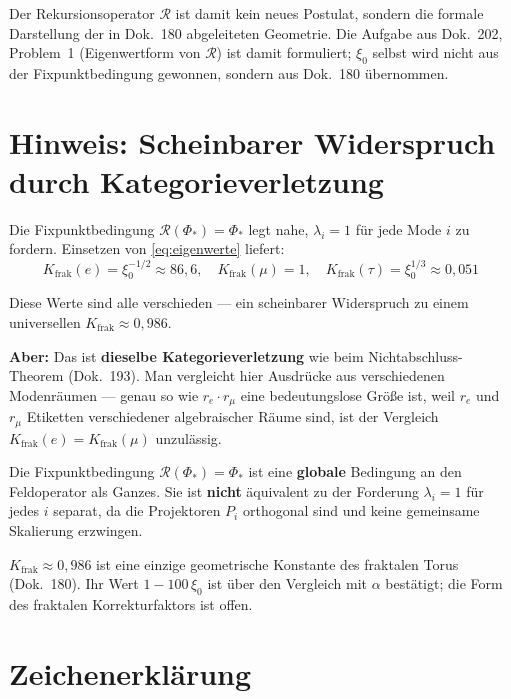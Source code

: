 Der Rekursionsoperator $\mathcal{R}$ ist damit kein neues Postulat,
sondern die formale Darstellung der in Dok.~180 abgeleiteten
Geometrie. Die Aufgabe aus Dok.~202, Problem~1 (Eigenwertform von
$\mathcal{R}$) ist damit formuliert; $\xi_0$ selbst wird nicht aus der
Fixpunktbedingung gewonnen, sondern aus Dok.~180 übernommen.

\section{Hinweis: Scheinbarer Widerspruch durch Kategorieverletzung}

Die Fixpunktbedingung $\mathcal{R}(\Phi_*) = \Phi_*$ legt nahe,
$\lambda_i = 1$ für jede Mode $i$ zu fordern. Einsetzen von
\eqref{eq:eigenwerte} liefert:
\[
  K_{\text{frak}}(e) = \xi_0^{-1/2} \approx 86{,}6, \quad
  K_{\text{frak}}(\mu) = 1, \quad
  K_{\text{frak}}(\tau) = \xi_0^{1/3} \approx 0{,}051
\]

Diese Werte sind alle verschieden — ein scheinbarer Widerspruch
zu einem universellen $K_{\text{frak}} \approx 0{,}986$.

\textbf{Aber:} Das ist \textbf{dieselbe Kategorieverletzung}
wie beim Nichtabschluss-Theorem (Dok.~193). Man vergleicht hier
Ausdrücke aus verschiedenen Modenräumen — genau so wie
$r_e \cdot r_\mu$ eine bedeutungslose Größe ist, weil $r_e$ und
$r_\mu$ Etiketten verschiedener algebraischer Räume sind,
ist der Vergleich $K_{\text{frak}}(e) = K_{\text{frak}}(\mu)$
unzulässig.

Die Fixpunktbedingung $\mathcal{R}(\Phi_*) = \Phi_*$ ist eine
\textbf{globale} Bedingung an den Feldoperator als Ganzes.
Sie ist \textbf{nicht} äquivalent zu der Forderung
$\lambda_i = 1$ für jedes $i$ separat, da die Projektoren
$P_i$ orthogonal sind und keine gemeinsame Skalierung erzwingen.

$K_{\text{frak}} \approx 0{,}986$ ist eine einzige geometrische
Konstante des fraktalen Torus (Dok.~180). Ihr Wert $1-100\,\xi_0$
ist über den Vergleich mit $\alpha$ bestätigt; die Form des fraktalen
Korrekturfaktors ist offen.


\section*{Zeichenerklärung}

